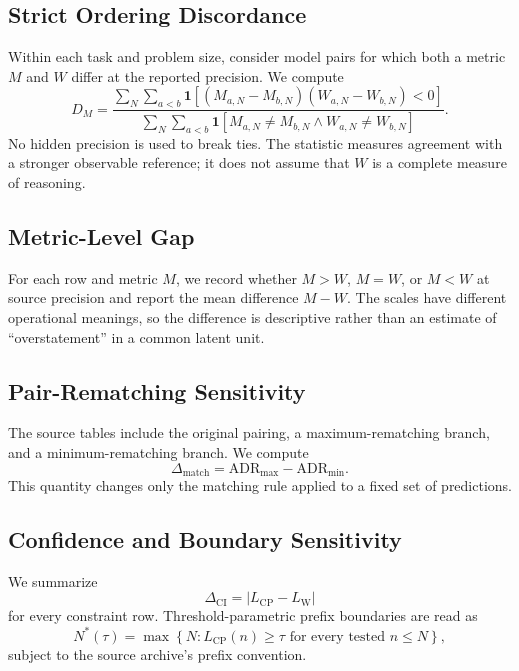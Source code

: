 \documentclass[acmsmall,screen,review,anonymous]{acmart}
\providecommand{\ADR}{\mathrm{ADR}}
\begin{document}
\subsection{Strict Ordering Discordance}

Within each task and problem size, consider model pairs for which both a
metric \(M\) and \(W\) differ at the reported precision. We compute
\[
D_M
=
\frac{
\sum_N\sum_{a<b}
\mathbf{1}\!\left[
(M_{a,N}-M_{b,N})(W_{a,N}-W_{b,N})<0
\right]
}{
\sum_N\sum_{a<b}
\mathbf{1}\!\left[
M_{a,N}\neq M_{b,N}\land W_{a,N}\neq W_{b,N}
\right]
}.
\]
No hidden precision is used to break ties. The statistic measures agreement
with a stronger observable reference; it does not assume that \(W\) is a
complete measure of reasoning.

\subsection{Metric-Level Gap}

For each row and metric \(M\), we record whether \(M>W\), \(M=W\), or \(M<W\)
at source precision and report the mean difference \(M-W\). The scales have
different operational meanings, so the difference is descriptive rather
than an estimate of ``overstatement'' in a common latent unit.

\subsection{Pair-Rematching Sensitivity}

The source tables include the original pairing, a maximum-rematching branch,
and a minimum-rematching branch. We compute
\[
\Delta_{\mathrm{match}}
=
\ADR_{\max}-\ADR_{\min}.
\]
This quantity changes only the matching rule applied to a fixed set of
predictions.

\subsection{Confidence and Boundary Sensitivity}

We summarize
\[
\Delta_{\mathrm{CI}}
=
|L_{\mathrm{CP}}-L_{\mathrm{W}}|
\]
for every constraint row. Threshold-parametric prefix boundaries are read as
\[
N^*(\tau)=
\max\left\{
N:
L_{\mathrm{CP}}(n)\ge\tau
\text{ for every tested }n\le N
\right\},
\]
subject to the source archive's prefix convention.
\end{document}
